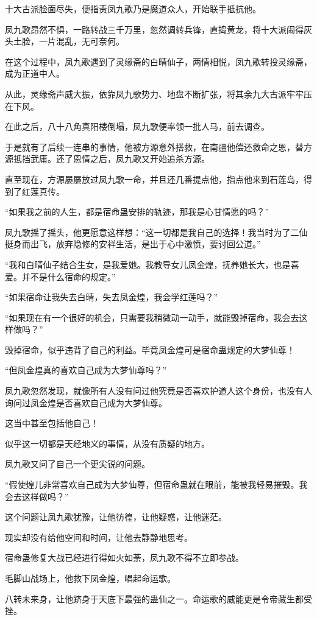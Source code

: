 \begin{this_body}
十大古派脸面尽失，便指责凤九歌乃是魔道众人，开始联手抵抗他。

凤九歌昂然不惧，一路转战三千万里，忽然调转兵锋，直捣黄龙，将十大派闹得灰头土脸，一片混乱，无可奈何。

在这个过程中，凤九歌遇到了灵缘斋的白晴仙子，两情相悦，凤九歌转投灵缘斋，成为正道中人。

从此，灵缘斋声威大振，依靠凤九歌势力、地盘不断扩张，将其余九大古派牢牢压在下风。

在此之后，八十八角真阳楼倒塌，凤九歌便率领一批人马，前去调查。

于是就有了后续一连串的事情，他被方源意外搭救，在南疆他偿还救命之恩，替方源抵挡武庸。还了恩情之后，凤九歌又开始追杀方源。

直至现在，方源屡屡放过凤九歌一命，并且还几番提点他，指点他来到石莲岛，得到了红莲真传。

“如果我之前的人生，都是宿命蛊安排的轨迹，那我是心甘情愿的吗？”

凤九歌摇了摇头，他更愿意这样想：“这一切都是我自己的选择！我当时为了二仙挺身而出飞，放弃隐修的安祥生活，是出于心中激愤，要讨回公道。”

“我和白晴仙子结合生女，是我爱她。我教导女儿凤金煌，抚养她长大，也是喜爱。并不是什么宿命的规定。”

“如果宿命让我失去白晴，失去凤金煌，我会学红莲吗？”

“如果现在有一个很好的机会，只需要我稍微动一动手，就能毁掉宿命，我会去这样做吗？”

毁掉宿命，似乎违背了自己的利益。毕竟凤金煌可是宿命蛊规定的大梦仙尊！

“但凤金煌真的喜欢自己成为大梦仙尊吗？”

凤九歌忽然发现，就像所有人没有问过他究竟是否喜欢护道人这个身份，也没有人询问过凤金煌是否喜欢自己成为大梦仙尊。

这当中甚至包括他自己！

似乎这一切都是天经地义的事情，从没有质疑的地方。

凤九歌又问了自己一个更尖锐的问题。

“假使煌儿非常喜欢自己成为大梦仙尊，但宿命蛊就在眼前，能被我轻易摧毁。我会去这样做吗？”

这个问题让凤九歌犹豫，让他彷徨，让他疑惑，让他迷茫。

现实却没有给他空间和时间，让他去静静地思考。

宿命蛊修复大战已经进行得如火如荼，凤九歌不得不立即参战。

毛脚山战场上，他救下凤金煌，唱起命运歌。

八转未来身，让他跻身于天底下最强的蛊仙之一。命运歌的威能更是令帝藏生都受挫。


\end{this_body}
